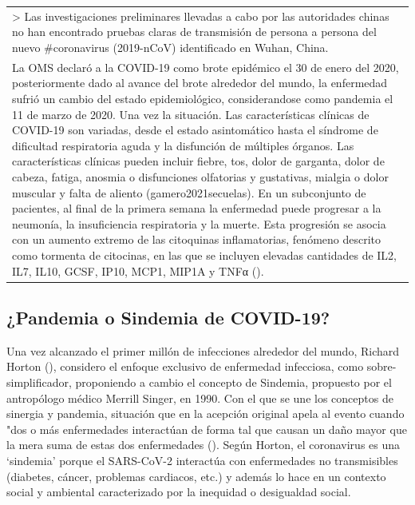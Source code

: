 \documentclass[
  12pt, krantz2,
  spanish,
]{krantz}
\begin{document}
\begin{longtable}[]{@{}
  >{\raggedright\arraybackslash}p{}@{}}
\textgreater{} Las investigaciones preliminares llevadas a cabo por las autoridades chinas no han encontrado pruebas claras de transmisión de persona a persona del nuevo \#coronavirus (2019-nCoV) identificado en Wuhan, China. \\
La OMS declaró a la COVID-19 como brote epidémico el 30 de enero del 2020, posteriormente dado al avance del brote alrededor del mundo, la enfermedad sufrió un cambio del estado epidemiológico, considerandose como pandemia el 11 de marzo de 2020. Una vez la situación. Las características clínicas de COVID-19 son variadas, desde el estado asintomático hasta el síndrome de dificultad respiratoria aguda y la disfunción de múltiples órganos. Las características clínicas pueden incluir fiebre, tos, dolor de garganta, dolor de cabeza, fatiga, anosmia o disfunciones olfatorias y gustativas, mialgia o dolor muscular y falta de aliento (gamero2021secuelas). En un subconjunto de pacientes, al final de la primera semana la enfermedad puede progresar a la neumonía, la insuficiencia respiratoria y la muerte. Esta progresión se asocia con un aumento extremo de las citoquinas inflamatorias, fenómeno descrito como tormenta de citocinas, en las que se incluyen elevadas cantidades de IL2, IL7, IL10, GCSF, IP10, MCP1, MIP1A y TNFα (\citet{gamero2021secuelas}). \\
\bottomrule
\end{longtable}

\hypertarget{pandemia-o-sindemia-de-covid-19}{%
\subsection{¿Pandemia o Sindemia de COVID-19?}\label{pandemia-o-sindemia-de-covid-19}}

Una vez alcanzado el primer millón de infecciones alrededor del mundo, Richard Horton (\citet{horton2020offline}), considero el enfoque exclusivo de enfermedad infecciosa, como sobre-simplificador, proponiendo a cambio el concepto de Sindemia, propuesto por el antropólogo médico Merrill Singer, en 1990. Con el que se une los conceptos de sinergia y pandemia, situación que en la acepción original apela al evento cuando "dos o más enfermedades interactúan de forma tal que causan un daño mayor que la mera suma de estas dos enfermedades (\citet{horton2020offline}). Según Horton, el coronavirus es una `sindemia' porque el SARS-CoV-2 interactúa con enfermedades no transmisibles (diabetes, cáncer, problemas cardiacos, etc.) y además lo hace en un contexto social y ambiental caracterizado por la inequidad o desigualdad social.
\end{document}
